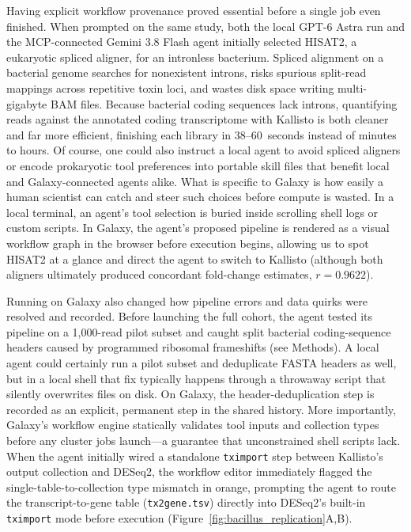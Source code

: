 \documentclass[11pt,letterpaper]{article}
\begin{document}
Having explicit workflow provenance proved essential before a single job even finished. When prompted on the same study, both the local GPT-6 Astra run and the MCP-connected Gemini 3.8 Flash agent initially selected HISAT2, a eukaryotic spliced aligner, for an intronless bacterium. Spliced alignment on a bacterial genome searches for nonexistent introns, risks spurious split-read mappings across repetitive toxin loci, and wastes disk space writing multi-gigabyte BAM files. Because bacterial coding sequences lack introns, quantifying reads against the annotated coding transcriptome with Kallisto \cite{bray2016near} is both cleaner and far more efficient, finishing each library in 38--60~seconds instead of minutes to hours. Of course, one could also instruct a local agent to avoid spliced aligners or encode prokaryotic tool preferences into portable skill files that benefit local and Galaxy-connected agents alike. What is specific to Galaxy is how easily a human scientist can catch and steer such choices before compute is wasted. In a local terminal, an agent's tool selection is buried inside scrolling shell logs or custom scripts. In Galaxy, the agent's proposed pipeline is rendered as a visual workflow graph in the browser before execution begins, allowing us to spot HISAT2 at a glance and direct the agent to switch to Kallisto (although both aligners ultimately produced concordant fold-change estimates, $r = 0.9622$).

Running on Galaxy also changed how pipeline errors and data quirks were resolved and recorded. Before launching the full cohort, the agent tested its pipeline on a 1,000-read pilot subset and caught split bacterial coding-sequence headers caused by programmed ribosomal frameshifts (see Methods). A local agent could certainly run a pilot subset and deduplicate FASTA headers as well, but in a local shell that fix typically happens through a throwaway script that silently overwrites files on disk. On Galaxy, the header-deduplication step is recorded as an explicit, permanent step in the shared history. More importantly, Galaxy's workflow engine statically validates tool inputs and collection types before any cluster jobs launch---a guarantee that unconstrained shell scripts lack. When the agent initially wired a standalone \texttt{tximport} step between Kallisto's output collection and DESeq2, the workflow editor immediately flagged the single-table-to-collection type mismatch in orange, prompting the agent to route the transcript-to-gene table (\texttt{tx2gene.tsv}) directly into DESeq2's built-in \texttt{tximport} mode before execution (Figure~\ref{fig:bacillus_replication}A,B).
\end{document}
